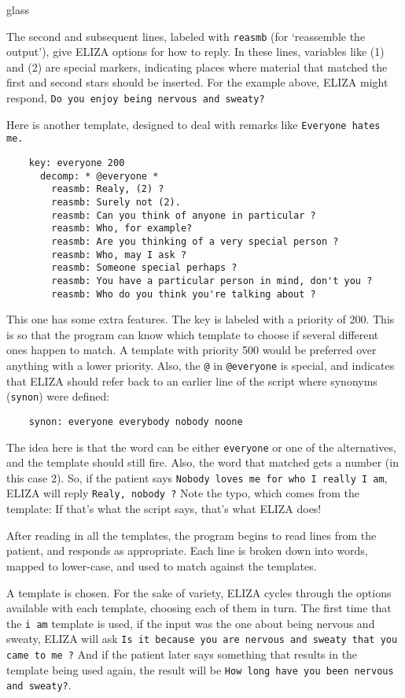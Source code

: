\begin{tblsfilledsymbol}{}{glass}
\begin{underthehood}
The second and subsequent lines, labeled with \texttt{reasmb} (for `reassemble the output'), give ELIZA options for how to reply. In these lines, variables like (1) and (2) are special markers, indicating places where material that matched the first and second stars should be inserted.  For the example above, ELIZA might respond, \texttt{Do you enjoy being nervous and sweaty?}

Here is another template, designed to deal with remarks like \texttt{Everyone hates me.}
\begin{verbatim}
	key: everyone 200
	  decomp: * @everyone *
	    reasmb: Realy, (2) ?
	    reasmb: Surely not (2).
	    reasmb: Can you think of anyone in particular ?
	    reasmb: Who, for example?
	    reasmb: Are you thinking of a very special person ?
	    reasmb: Who, may I ask ?
	    reasmb: Someone special perhaps ?
	    reasmb: You have a particular person in mind, don't you ?
	    reasmb: Who do you think you're talking about ?
\end{verbatim}
This one has some extra features. The key is labeled with a priority of 200. This is so that the program can know which template to choose if several different ones happen to match. A template with priority 500 would be preferred over anything with a lower priority. Also, the \texttt{@} in \texttt{@everyone} is special, and indicates that ELIZA should refer back to an earlier line of the script where synonyms (\texttt{synon}) were defined:

\begin{verbatim}
	synon: everyone everybody nobody noone
\end{verbatim}

The idea here is that the word can be either \texttt{everyone} or one of the alternatives, and the template should still fire. Also, the word that matched gets a number (in this case 2).
So, if the patient says \texttt{Nobody loves me for who I really I am}, ELIZA will reply \texttt{Realy, nobody ?}  Note the typo, which comes from the template: If that's what the script says, that's what ELIZA does!

After reading in all the templates, the program begins to read lines from the patient, and responds as appropriate. Each line is broken down into words, mapped to lower-case, and used to match against the templates.

A template is chosen. For the sake of variety, ELIZA cycles through the options available with each template, choosing each of them in turn.
The first time that the \texttt{i am} template is used, 
if the input was the one about being nervous and sweaty, 
ELIZA will ask \texttt{Is it because you are nervous and sweaty that you came to me ?} And if the patient
later says something that results in the template being used again, the result will be \texttt{How long have you been nervous and sweaty?}.


\end{underthehood}
\end{tblsfilledsymbol}
